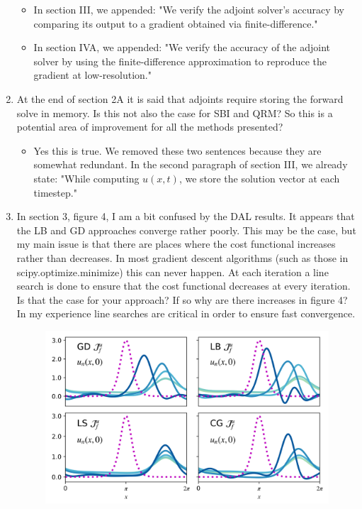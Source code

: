 \documentclass[%
 letter,
 amsmath,amssymb,
]{revtex4-2}
\begin{document}
\begin{enumerate}
\begin{itemize}
\item In section III, we appended: "We verify the adjoint solver's accuracy by comparing its output to a gradient obtained via finite-difference."
\item In section IVA, we appended: "We verify the accuracy of the adjoint solver by using the finite-difference approximation to reproduce the gradient at low-resolution."

\end{itemize}\color{black}\item At the end of section 2A it  is said that adjoints require storing the forward solve in memory. Is this not also the case for SBI and QRM? So this is a potential area of  improvement for all the methods presented?  \\
\color{blue}\begin{itemize}
  
  \item Yes this is true. We removed these two sentences because they are somewhat redundant. In the second paragraph of section III, we already state: "While computing $u(x, t)$, we store the solution vector at each timestep."
  
\end{itemize}\color{black}\item In section 3, figure 4, I am a bit confused by the DAL results. It  appears that the LB and GD approaches converge rather poorly. This may  be the case, but my main issue is that there are places where the cost  functional increases rather than decreases. In most gradient descent  algorithms (such as those in scipy.optimize.minimize) this can never  happen. At each iteration a line search is done to ensure that the  cost functional decreases at every iteration. Is that the case for  your approach? If so why are there increases in figure 4? In my  experience line searches are critical in order to ensure fast  convergence.  \\
\color{blue}\begin{itemize}
  
  \begin{figure}[h]
    \centering
    \includegraphics[width=5in]{Pasted image 20240221182636.png}
    \caption{}
  \end{figure}
   

\end{itemize}
\end{enumerate}
\end{document}
